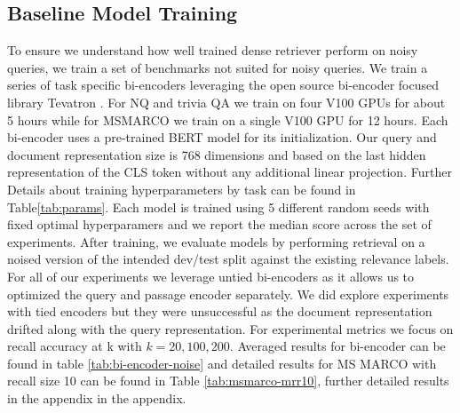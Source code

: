 \subsection{Baseline Model Training}
\begin{table}[h!]
    \centering
    \caption{Model Training parameters across tasks. NQ and TriviaQA are trained using 4 V100s while MSMARCO uses a single V100}
    \label{tab:params}
\end{table}
To ensure we understand how well trained dense retriever perform on noisy queries, we train a set of benchmarks not suited for noisy queries. We train a series of task specific bi-encoders leveraging the open source bi-encoder focused library Tevatron \cite{Gao2022TevatronAE}. For NQ and trivia QA we train on four V100 GPUs for about 5 hours while for MSMARCO we train on a single V100 GPU for 12 hours. Each bi-encoder uses a pre-trained BERT \cite{Devlin2019BERTPO} model for its initialization. Our query and document representation size is 768 dimensions and based on the last hidden representation of the CLS token without any additional linear projection. Further Details about training hyperparameters by task can be found in Table\ref{tab:params}. Each model is trained using 5 different random seeds with fixed optimal hyperparamers and we report the median score across the set of experiments. After training, we evaluate models by performing retrieval on a noised version of the intended dev/test split against the existing relevance labels. For all of our experiments we leverage untied bi-encoders as it allows us to optimized the query and passage encoder separately. We did explore experiments with tied encoders but they were unsuccessful as the document representation drifted along with the query representation. For experimental metrics we focus on recall accuracy at k with $k={20,100,200}$. Averaged results for bi-encoder can be found in table \ref{tab:bi-encoder-noise} and detailed results for MS MARCO with recall size 10 can be found in Table \ref{tab:msmarco-mrr10}, further detailed results in the appendix in the appendix. \\
